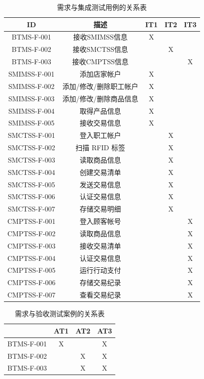 \begin{enumerate}
						\begin{table}[!htbp]
					\centering
					\caption{需求与集成测试用例的关系表}
					\label{table11}
					\begin{tabular}{|c|c|c|c|c|}
					\hline
					ID & 描述 & IT1 & IT2 & IT3 \\ \hline
					BTMS-F-001 & 接收SMIMSS信息 & X &  &  \\ \hline
					BTMS-F-002 & 接收SMCTSS信息 &  & X &  \\ \hline
					BTMS-F-003 & 接收CMPTSS信息 &  &  & X \\ \hline
					SMIMSS-F-001 & 添加店家帐户 & X &  &  \\ \hline
					SMIMSS-F-002 & 添加/修改/删除职工帐户 & X &  &  \\ \hline
					SMIMSS-F-003 & 添加/修改/删除商品信息 & X &  &  \\ \hline
					SMIMSS-F-004 & 取得产品信息 & X &  &  \\ \hline
					SMIMSS-F-005 & 接收交易信息 & X &  &  \\ \hline
					SMCTSS-F-001 & 登入职工帐户 &  & X &  \\ \hline
					SMCTSS-F-002 & 扫描 RFID 标签 &  & X &  \\ \hline
					SMCTSS-F-003 & 读取商品信息 &  & X &  \\ \hline
					SMCTSS-F-004 & 创建交易清单 &  & X &  \\ \hline
					SMCTSS-F-005 & 发送交易信息 &  & X &  \\ \hline
					SMCTSS-F-006 & 认证交易信息 &  & X &  \\ \hline
					SMCTSS-F-007 & 存储交易明细 &  & X &  \\ \hline
					CMPTSS-F-001 & 登入顾客帐号 &  &  & X \\ \hline
					CMPTSS-F-002 & 读取商品信息 &  &  & X \\ \hline
					CMPTSS-F-003 & 接收交易清单 &  &  & X \\ \hline
					CMPTSS-F-004 & 认证交易信息 &  &  & X \\ \hline
					CMPTSS-F-005 & 运行行动支付 &  &  & X \\ \hline
					CMPTSS-F-006 & 存储交易纪录 &  &  & X \\ \hline
					CMPTSS-F-007 & 查看交易纪录 &  &  & X \\ \hline
					\end{tabular}
					\end{table}


					\begin{table}[!htbp]
					\centering
					\caption{需求与验收测试案例的关系表}
					\label{table12}
					\begin{tabular}{|l|c|c|c|}
					\hline
					 & \multicolumn{1}{l|}{AT1} & \multicolumn{1}{l|}{AT2} & \multicolumn{1}{l|}{AT3} \\ \hline
					BTMS-F-001 & X &  & X \\ \hline
					BTMS-F-002 &  & X & X \\ \hline
					BTMS-F-003 &  & X & X \\ \hline
					\end{tabular}
					\end{table}



\end{enumerate}
